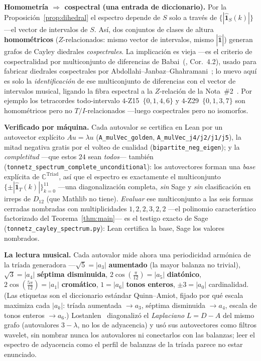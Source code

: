 \documentclass[11pt]{article}
\newcommand{\lean}[1]{\texttt{#1}}
\begin{document}
\textbf{Homometr\'ia $\Rightarrow$ cospectral (una entrada de diccionario).} Por la
Proposici\'on~\ref{prop:dihedral} el espectro depende de $S$ solo a trav\'es de
$\{|\hat{\mathbf 1}_S(k)|\}$ ---el vector de intervalos de $S$. As\'i, dos conjuntos de clases de altura
\textbf{homom\'etricos} ($Z$-relacionados: mismo vector de intervalos, mismo $|\hat{\mathbf 1}|$) generan
grafos de Cayley diedrales \emph{cospectrales}. La implicaci\'on es vieja ---es el criterio de cospectralidad
por multiconjunto de diferencias de Babai~(\cite{Babai}, Cor.~4.2), usado para fabricar diedrales
cospectrales por Abdollahi--Janbaz--Ghahramani~\cite{Abdollahi}; lo nuevo aqu\'i es solo la
\emph{identificaci\'on} de ese multiconjunto de diferencias con el vector de intervalos musical, ligando la
fibra espectral a la $Z$-relaci\'on de la Nota~\#2~\cite{Note2}. Por ejemplo los tetracordes todo-intervalo
$4$-Z15~$\{0,1,4,6\}$ y $4$-Z29~$\{0,1,3,7\}$ son homom\'etricos pero no $T/I$-relacionados ---luego
cospectrales pero no isomorfos.

\textbf{Verificado por m\'aquina.} Cada autovalor se certifica en Lean por un autovector expl\'icito
$Au=\lambda u$ (\lean{A\_mulVec\_golden}, \lean{A\_mulVec\_j4/j2/j1/j5}), la mitad negativa gratis por el
volteo de cualidad (\lean{bipartite\_neg\_eigen}); y la \emph{completitud} ---que estos $24$ sean
\emph{todos}--- tambi\'en (\lean{tonnetz\_spectrum\_complete\_unconditional}): los autovectores forman una
\emph{base} expl\'icita de $\mathbb{C}^{\mathrm{Triad}}$, as\'i que el espectro es exactamente el
multiconjunto $\{\pm|\hat{\mathbf 1}_T(k)|\}_{k=0}^{11}$ ---una diagonalizaci\'on completa, \emph{sin} Sage y
\emph{sin} clasificaci\'on en irreps de $D_{12}$ (que Mathlib no tiene). \emph{Evaluar} ese multiconjunto a
las seis formas cerradas nombradas con multiplicidades $1,2,2,3,2,2$ ---el polinomio caracter\'istico
factorizado del Teorema~\ref{thm:main}--- es el testigo exacto de Sage (\lean{tonnetz\_cayley\_spectrum.py}):
Lean certifica la base, Sage los valores nombrados.

\textbf{La lectura musical.} Cada autovalor mide ahora una periodicidad arm\'onica de la tr\'iada generadora
---$\sqrt5=|a_3|$ \textbf{aumentado} (la mayor balanza no
trivial), $\sqrt3=|a_4|$ \textbf{s\'eptima disminuida}, $2\cos(\tfrac{\pi}{12})=|a_5|$ \textbf{diat\'onico},
$2\cos(\tfrac{5\pi}{12})=|a_1|$ \textbf{crom\'atico}, $1=|a_6|$ \textbf{tonos enteros}, $\pm3=|a_0|$
cardinalidad. (Las etiquetas son el diccionario est\'andar Quinn--Amiot, fijado por qu\'e escala maximiza
cada $|a_k|$: tr\'iada aumentada $\to a_3$, s\'eptima disminuida $\to a_4$, escala de tonos enteros $\to
a_6$.) Lostanlen~\cite{Lostanlen} diagonaliz\'o el \emph{Laplaciano} $L=D-A$ del mismo grafo (autovalores
$3-\lambda$, no los de adyacencia) y us\'o sus autovectores como filtros wavelet, sin nombrar nunca los
autovalores ni conectarlos con las balanzas; leer el espectro de adyacencia como el perfil de balanzas de la
tr\'iada parece no estar enunciado.
\end{document}
